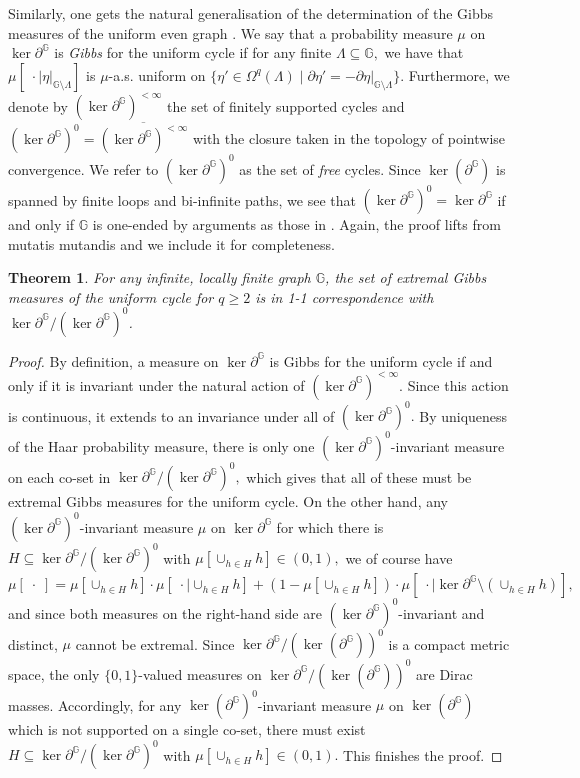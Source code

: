\documentclass[article,11pt,reqno]{amsart}
\newtheorem{theorem}{Theorem}[section]
\begin{document}
 Similarly, one gets the natural generalisation of the determination of the Gibbs measures of the uniform even graph \cite[Theorem 3.14]{hansen2023uniform}. We say that a probability measure $\mu$ on $\ker \partial^\mathbb{G}$ is \textit{Gibbs} for the uniform cycle if for any finite $\Lambda\subseteq \mathbb{G},$ we have that $\mu[\;\cdot\mid \eta|_{\mathbb{G}\setminus \Lambda}]$ is $\mu$-a.s. uniform on $\{\eta' \in \Omega^q(\Lambda)\mid \partial \eta'=-\partial \eta|_{\mathbb{G}\setminus \Lambda} \}.$ Furthermore, we denote by $(\ker \partial^\mathbb{G})^{<\infty}$ the set of finitely supported cycles and $(\ker \partial^\mathbb{G})^{0}=\overline{(\ker \partial^\mathbb{G})^{<\infty}}$ with the closure taken in the topology of pointwise convergence. We refer to $(\ker \partial^\mathbb{G})^{0}$ as the set of \emph{free} cycles. Since $\ker(\partial^\mathbb{G})$ is spanned by finite loops and bi-infinite paths, we see that $(\ker \partial^\mathbb{G})^{0}=\ker \partial^\mathbb{G}$ if and only if $\mathbb{G}$ is one-ended by arguments as those in \cite{angel2021uniform,hansen2023uniform}. Again, the proof lifts from \cite{hansen2023uniform} mutatis mutandis and we include it for completeness.
 \begin{theorem} \label{Gibbs for cycles}
For any infinite, locally finite graph $\mathbb{G}$, the set of extremal Gibbs measures of the uniform cycle for $q\geq 2$ is in 1-1 correspondence with $\ker \partial^\mathbb{G}/(\ker \partial^\mathbb{G})^0$.
\end{theorem}
\begin{proof} By definition, a measure on $\ker \partial^\mathbb{G}$ is Gibbs for the uniform cycle if and only if it is invariant under the natural action of $(\ker \partial^\mathbb{G})^{<\infty}$. Since this action is continuous, it extends to an invariance under all of $(\ker \partial^\mathbb{G})^{0}.$ By uniqueness of the Haar probability measure, there is only one  $(\ker \partial^\mathbb{G})^{0}$-invariant measure on each co-set in $\ker \partial^\mathbb{G}/(\ker \partial^\mathbb{G})^0,$ which gives that all of these must be extremal Gibbs measures for the uniform cycle. On the other hand, any $(\ker \partial^\mathbb{G})^0$-invariant measure $\mu$ on $\ker \partial^\mathbb{G}$ for which there is $H\subseteq \ker \partial^\mathbb{G}/(\ker \partial^\mathbb{G})^0$ with $\mu[\cup_{h\in H} h]\in (0,1),$ we of course have
$$
\mu[\;\cdot\;]=\mu[\cup_{h\in H} h]\cdot \mu[\;\cdot \mid \cup_{h\in H} h]+(1-\mu[\cup_{h\in H}h])\cdot \mu[\;\cdot \mid \ker\partial^\mathbb{G}\setminus (\cup_{h\in H}h)],
$$
and since both measures on the right-hand side are $(\ker\partial^\mathbb{G})^0$-invariant and distinct, $\mu$ cannot be extremal. Since $\ker \partial^\mathbb{G}/(\ker(\partial ^{\mathbb{G}}))^0$ is a compact metric space, the only $\{0,1\}$-valued measures on $\ker \partial^\mathbb{G}/(\ker(\partial ^{\mathbb{G}}))^0$ are Dirac masses. Accordingly, for any $\ker(\partial^{\mathbb{G}})^0$-invariant measure $\mu$ on $\ker(\partial^{\mathbb{G}})$ which is not supported on a single co-set, there must exist $H\subseteq \ker \partial^\mathbb{G}/(\ker \partial^\mathbb{G})^0$ with $\mu[\cup_{h\in H} h]\in (0,1).$ This finishes the proof.
\end{proof}
\end{document}
